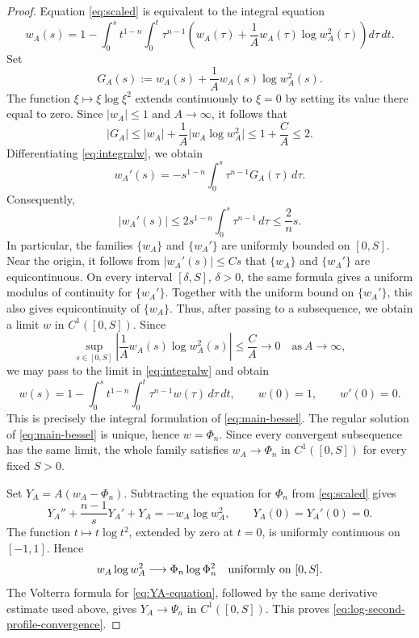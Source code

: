 \documentclass[11pt]{article}
\begin{document}
\begin{proof}
Equation \eqref{eq:scaled} is equivalent to the integral equation
\begin{equation}\label{eq:integralw}
 w_A(s)=1-\int_0^s t^{1-n}\int_0^t \tau^{n-1}\left(w_A(\tau)+\frac1A w_A(\tau)\log w_A^2(\tau)\right)d\tau\,dt.
\end{equation}
Set
\[
 G_A(s):=w_A(s)+\frac1A w_A(s)\log w_A^2(s).
\]
The function $\xi\mapsto \xi\log\xi^2$ extends continuously to $\xi=0$ by setting its value there equal to zero. Since $|w_A|\leq 1$ and $A\rightarrow\infty$, it follows that
\begin{equation*}
|G_A|\leq |w_A|+\frac1A \big|w_A\log w_A^2\big|\leq 1+\frac{C}{A}\leq2.
\end{equation*}
 Differentiating \eqref{eq:integralw}, we obtain
\begin{equation*}
 w_A'(s)=-s^{1-n}\int_0^s \tau^{n-1}G_A(\tau)\,d\tau.
\end{equation*}
Consequently,
 \begin{equation*}
 |w_A'(s)|\leq 2s^{1-n}\int_0^s \tau^{n-1}\,d\tau \leq \frac{2}{n}s.
\end{equation*}
 In particular, the families $\{w_A\}$ and $\{w_A'\}$ are uniformly bounded on $[0,S]$. Near the origin, it follows from
$|w_A'(s)|\leq Cs$ that $\{w_A\}$ and $\{w_A'\}$ are  equicontinuous.
On every interval
$[\delta,S]$, $\delta>0$, the same formula gives a uniform modulus of continuity for $\{w_A'\}$. Together with the uniform bound on $\{w_A'\}$, this also gives equicontinuity of $\{w_A\}$.
Thus, after passing to a subsequence, we obtain a limit $w$ in $C^1([0,S])$.  Since
\begin{equation*}
\sup_{s\in[0,S]}\left|
\frac1A w_A(s)\log w_A^2(s)\right|\leq \frac{C}{A}\longrightarrow0\quad \text{as}~A\rightarrow\infty,
\end{equation*}
we may pass to the limit in \eqref{eq:integralw} and obtain
\[
 w(s)=1-\int_0^s t^{1-n}\int_0^t \tau^{n-1}w(\tau)\,d\tau\,dt,\qquad w(0)=1,\qquad
w'(0)=0.
\]
This is precisely the integral formulation of \eqref{eq:main-bessel}. The regular solution of \eqref{eq:main-bessel} is unique, hence $w=\Phi_n$. Since every convergent subsequence has the same limit, the whole family satisfies $w_A\to\Phi_n$ in $C^1([0,S])$ for every fixed $S>0$.

Set $Y_A=A(w_A-\Phi_n)$. Subtracting the equation for $\Phi_n$ from
\eqref{eq:scaled} gives
\begin{equation}\label{eq:YA-equation}
 Y_A''+\frac{n-1}{s}Y_A'+Y_A=-w_A\log w_A^2,
 \qquad Y_A(0)=Y_A'(0)=0.
\end{equation}
The function $t\mapsto t\log t^2$, extended by zero at $t=0$, is uniformly
continuous on $[-1,1]$. Hence
\[
 w_A\log w_A^2\longrightarrow\Phi_n\log\Phi_n^2
 \quad\hbox{uniformly on }[0,S].
\]
The Volterra formula for \eqref{eq:YA-equation}, followed by the same
derivative estimate used above, gives
$Y_A\to\Psi_n$ in $C^1([0,S])$. This proves
\eqref{eq:log-second-profile-convergence}.


\end{proof}
\end{document}
